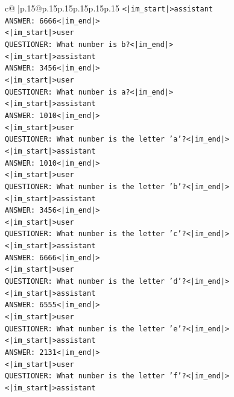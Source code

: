 \documentclass{article}
\begin{document}
{\begin{supertabular}{c@{$\;$}|p{.15\linewidth}@{}p{.15\linewidth}p{.15\linewidth}p{.15\linewidth}p{.15\linewidth}p{.15\linewidth}}
{{{\texttt{<|im\_start|>assistant} \\
\texttt{ANSWER: 6666<|im\_end|>} \\
\texttt{<|im\_start|>user} \\
\texttt{QUESTIONER: What number is b?<|im\_end|>} \\
\texttt{<|im\_start|>assistant} \\
\texttt{ANSWER: 3456<|im\_end|>} \\
\texttt{<|im\_start|>user} \\
\texttt{QUESTIONER: What number is a?<|im\_end|>} \\
\texttt{<|im\_start|>assistant} \\
\texttt{ANSWER: 1010<|im\_end|>} \\
\texttt{<|im\_start|>user} \\
\texttt{QUESTIONER: What number is the letter 'a'?<|im\_end|>} \\
\texttt{<|im\_start|>assistant} \\
\texttt{ANSWER: 1010<|im\_end|>} \\
\texttt{<|im\_start|>user} \\
\texttt{QUESTIONER: What number is the letter 'b'?<|im\_end|>} \\
\texttt{<|im\_start|>assistant} \\
\texttt{ANSWER: 3456<|im\_end|>} \\
\texttt{<|im\_start|>user} \\
\texttt{QUESTIONER: What number is the letter 'c'?<|im\_end|>} \\
\texttt{<|im\_start|>assistant} \\
\texttt{ANSWER: 6666<|im\_end|>} \\
\texttt{<|im\_start|>user} \\
\texttt{QUESTIONER: What number is the letter 'd'?<|im\_end|>} \\
\texttt{<|im\_start|>assistant} \\
\texttt{ANSWER: 6555<|im\_end|>} \\
\texttt{<|im\_start|>user} \\
\texttt{QUESTIONER: What number is the letter 'e'?<|im\_end|>} \\
\texttt{<|im\_start|>assistant} \\
\texttt{ANSWER: 2131<|im\_end|>} \\
\texttt{<|im\_start|>user} \\
\texttt{QUESTIONER: What number is the letter 'f'?<|im\_end|>} \\
\texttt{<|im\_start|>assistant} \\
}}}
\end{supertabular}}
\end{document}
